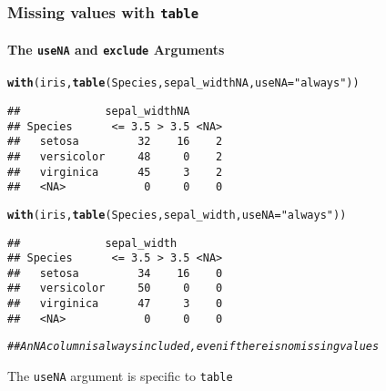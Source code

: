 \documentclass[paper=screen,mathserif]{beamer}\usepackage[]{graphicx}\usepackage[]{color}
\makeatletter
\newcommand{\hlstr}[1]{\textcolor[rgb]{0.192,0.494,0.8}{#1}}%
\newcommand{\hlcom}[1]{\textcolor[rgb]{0.678,0.584,0.686}{\textit{#1}}}%
\newcommand{\hlstd}[1]{\textcolor[rgb]{0.345,0.345,0.345}{#1}}%
\newcommand{\hlkwc}[1]{\textcolor[rgb]{0.333,0.667,0.333}{#1}}%
\newcommand{\hlkwd}[1]{\textcolor[rgb]{0.737,0.353,0.396}{\textbf{#1}}}%
\newenvironment{kframe}{%
 \def\at@end@of@kframe{}%
 \ifinner\ifhmode%
  \def\at@end@of@kframe{\end{minipage}}%
  \begin{minipage}{\columnwidth}%
 \fi\fi%
 \def\FrameCommand##1{\hskip\@totalleftmargin \hskip-\fboxsep
 \colorbox{shadecolor}{##1}\hskip-\fboxsep
     \hskip-\linewidth \hskip-\@totalleftmargin \hskip\columnwidth}%
 \MakeFramed {\advance\hsize-\width
   \@totalleftmargin\z@ \linewidth\hsize
   \@setminipage}}%
 {\par\unskip\endMakeFramed%
 \at@end@of@kframe}
\newenvironment{knitrout}{}{} %
\newcommand{\ft}[1]{\frametitle{#1}}
\newcommand{\fst}[1]{\framesubtitle{#1}}
\makeatother
\begin{document}
\begin{frame}[fragile]
  \ft{Missing values with {\tt table}}
  \fst{The {\tt useNA} and {\tt exclude} Arguments}
  \vspace{-0.4cm}
\begin{knitrout}\scriptsize
{}\color{fgcolor}\begin{kframe}
\begin{alltt}
\hlkwd{with}\hlstd{(iris,} \hlkwd{table}\hlstd{(Species, sepal_widthNA,} \hlkwc{useNA} \hlstd{=} \hlstr{"always"}\hlstd{))}
\end{alltt}
\begin{verbatim}
##             sepal_widthNA
## Species      <= 3.5 > 3.5 <NA>
##   setosa         32    16    2
##   versicolor     48     0    2
##   virginica      45     3    2
##   <NA>            0     0    0
\end{verbatim}
\begin{alltt}
\hlkwd{with}\hlstd{(iris,} \hlkwd{table}\hlstd{(Species, sepal_width,} \hlkwc{useNA} \hlstd{=} \hlstr{"always"}\hlstd{))}
\end{alltt}
\begin{verbatim}
##             sepal_width
## Species      <= 3.5 > 3.5 <NA>
##   setosa         34    16    0
##   versicolor     50     0    0
##   virginica      47     3    0
##   <NA>            0     0    0
\end{verbatim}
\begin{alltt}
\hlcom{## An NA column is always included, even if there is no missing values}
\end{alltt}
\end{kframe}
\end{knitrout}

The {\tt useNA} argument is specific to {\tt table}
\end{frame}
\end{document}
